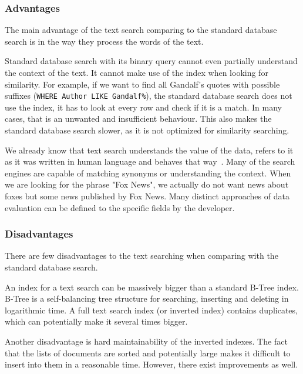 \subsubsection{Advantages}
The main advantage of the text search comparing to the standard database search is in the way they process the words of the text.

Standard database search with its binary query cannot even partially understand the context of the text. It cannot make use of the index when looking for similarity. For example, if we want to find all Gandalf's quotes with possible suffixes (\texttt{WHERE Author LIKE Gandalf\%}), the standard database se\-arch does not use the index, it has to look at every row and check if it is a match. In many cases, that is an unwanted and insufficient behaviour. This also makes the standard database search slower, as it is not optimized for similarity searching.

We already know that text search understands the value of the data, refers to it as it was written in human language and behaves that way~\cite{elastic}. Many of the search engines are capable of matching synonyms or understanding the context. When we are looking for the phrase "Fox News", we actually do not want news about foxes but some news published by Fox News. Many distinct approaches of data evaluation can be defined to the specific fields by the developer. 

\subsubsection{Disadvantages}
There are few disadvantages to the text searching when comparing with the standard database search.

An index for a text search can be massively bigger than a standard B-Tree index. B-Tree is a self-balancing tree structure for searching, inserting and deleting in logarithmic time. A full text search index (or inverted index) contains duplicates, which can potentially make it several times bigger.

Another disadvantage is hard maintainability of the inverted indexes. The fact that the lists of documents are sorted and potentially large makes it difficult to insert into them in a reasonable time. However, there exist improvements as well.
 

